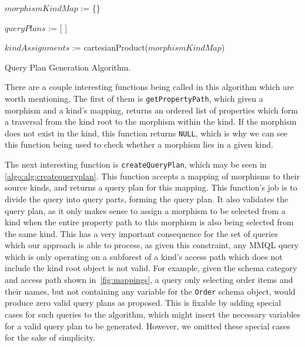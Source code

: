 \begin{algorithm}
\small
\DontPrintSemicolon
{}


$morphismKindMap$ := \{\}

$queryPlans$ := [ ]


$kindAssignments$ := cartesianProduct($morphismKindMap$)



\caption{Query Plan Generation Algorithm.}
\label{algo:alg:queryplan}
\end{algorithm}

There are a couple interesting functions being called in this algorithm which are worth mentioning.
The first of them is \texttt{getPropertyPath}, which given a morphism and a kind's mapping, returns an ordered list of properties which form a traversal from the kind root to the morphism within the kind.
If the morphism does not exist in the kind, this function returns \texttt{NULL}, which is why we can see this function being used to check whether a morphism lies in a given kind.

The next interesting function is \texttt{createQueryPlan}, which may be seen in \cref{algo:alg:createqueryplan}.
This function accepts a mapping of morphisms to their source kinds, and returns a query plan for this mapping.
This function's job is to divide the query into query parts, forming the query plan.
It also validates the query plan, as it only makes sense to assign a morphism to be selected from a kind when the entire property path to this morphism is also being selected from the same kind.
This has a very important consequence for the set of queries which our approach is able to process, as given this constraint, any MMQL query which is only operating on a subforest of a kind's access path which does not include the kind root object is not valid.
For example, given the schema category and access path shown in~\cref{fig:mappings}, a query only selecting order items and their names, but not containing any variable for the \texttt{Order} schema object, would produce zero valid query plans as proposed.
This is fixable by adding special cases for such queries to the algorithm, which might insert the necessary variables for a valid query plan to be generated.
However, we omitted these special cases for the sake of simplicity.

